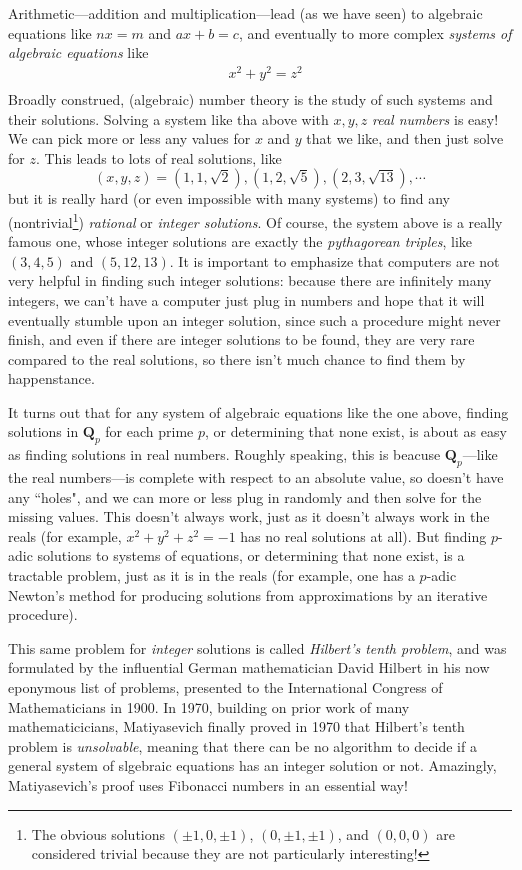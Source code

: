 \documentclass[11pt]{amsart}
\newcommand*{\Q}{\ensuremath{\mathbf{Q}}}
\theoremstyle{plain}
\theoremstyle{definition}
\theoremstyle{remark}
\numberwithin{theorem}{section}
\numberwithin{equation}{section}
\begin{document}
Arithmetic---addition and multiplication---lead (as we have seen) to 
algebraic equations like $nx=m$ and $ax+b=c$, and eventually to more complex {\em systems of algebraic equations}
like
\begin{align*}
	&x^2 + y^2 = z^2\\
\end{align*}
Broadly construed, (algebraic) number theory is the study of such systems and their solutions.  
Solving a system like tha above with $x,y,z$ {\em real numbers} is easy!  We can pick more or less
any values for $x$ and $y$ that we like, and then just solve for $z$.  This leads to lots of real solutions, like
$$
(x,y,z) = (1,1,\sqrt{2}), (1,2,\sqrt{5}), (2,3,\sqrt{13}),\cdots
$$
but it is really hard (or even impossible with many systems) to find any (nontrivial\footnote{The obvious solutions 
$(\pm1,0,\pm1)$, $(0,\pm 1, \pm 1)$, and $(0,0,0)$ are considered trivial because they are not particularly interesting!
}) {\em rational} or {\em integer solutions}.
Of course, the system above is a really famous one, whose integer solutions are exactly the {\em pythagorean triples},
like $(3,4,5)$ and $(5,12,13)$.  It is important to emphasize that computers are not very helpful in finding such integer solutions:
because there are infinitely many integers, we can't have a computer just plug in numbers and hope that it will eventually stumble upon an integer solution,
since such a procedure might never finish, and even if there are integer solutions to be found, they are very rare compared to the real solutions,
so there isn't much chance to find them by happenstance.  

It turns out that for any system of algebraic equations like the one above, 
finding solutions in $\Q_p$ for each prime $p$, or determining that none exist, 
is about as easy as finding solutions in real numbers.  Roughly speaking, this is beacuse $\Q_p$---like the real numbers---is complete
with respect to an absolute value, so doesn't have any ``holes", and we can more or less plug in randomly and then solve for the missing values.
This doesn't always work, just as it doesn't always work in the reals (for example, $x^2+y^2+z^2 = -1$ has no real solutions at all).
But finding $p$-adic solutions to systems of equations, or determining that none exist, is a tractable problem,
just as it is in the reals (for example, one has a $p$-adic Newton's method for producing solutions from approximations by an iterative procedure).

This same problem for {\em integer} solutions is called {\em Hilbert's tenth problem}, and was formulated by the influential 
German mathematician David Hilbert in his now eponymous list of problems, presented to the International Congress of Mathematicians in 1900.
In 1970, building on prior work of many mathematicicians, Matiyasevich finally proved in 1970 that Hilbert's tenth problem is {\em unsolvable},
meaning that there can be no algorithm to decide if a general system of slgebraic equations has an integer solution or not.
Amazingly, Matiyasevich's proof uses Fibonacci numbers in an essential way!
\end{document}
